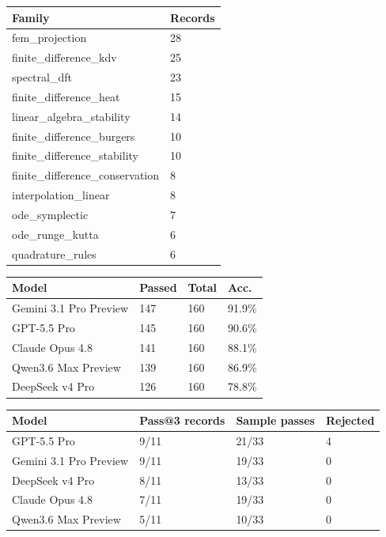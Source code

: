 \begin{tabular}{ll}
\toprule
Family & Records \\
\midrule
fem\_projection & 28 \\
finite\_difference\_kdv & 25 \\
spectral\_dft & 23 \\
finite\_difference\_heat & 15 \\
linear\_algebra\_stability & 14 \\
finite\_difference\_burgers & 10 \\
finite\_difference\_stability & 10 \\
finite\_difference\_conservation & 8 \\
interpolation\_linear & 8 \\
ode\_symplectic & 7 \\
ode\_runge\_kutta & 6 \\
quadrature\_rules & 6 \\
\bottomrule
\end{tabular}



\begin{tabular}{llll}
\toprule
Model & Passed & Total & Acc. \\
\midrule
Gemini 3.1 Pro Preview & 147 & 160 & 91.9\% \\
GPT-5.5 Pro & 145 & 160 & 90.6\% \\
Claude Opus 4.8 & 141 & 160 & 88.1\% \\
Qwen3.6 Max Preview & 139 & 160 & 86.9\% \\
DeepSeek v4 Pro & 126 & 160 & 78.8\% \\
\bottomrule
\end{tabular}



\begin{tabular}{llll}
\toprule
Model & Pass@3 records & Sample passes & Rejected \\
\midrule
GPT-5.5 Pro & 9/11 & 21/33 & 4 \\
Gemini 3.1 Pro Preview & 9/11 & 19/33 & 0 \\
DeepSeek v4 Pro & 8/11 & 13/33 & 0 \\
Claude Opus 4.8 & 7/11 & 19/33 & 0 \\
Qwen3.6 Max Preview & 5/11 & 10/33 & 0 \\
\bottomrule
\end{tabular}



